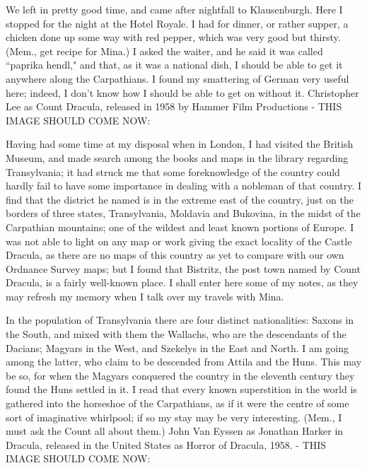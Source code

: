 We left in pretty good time, and came after nightfall to Klausenburgh. Here I stopped for the night at the Hotel Royale. I had for dinner, or rather supper, a chicken done up some way with red pepper, which was very good but thirsty. (Mem., get recipe for Mina.) I asked the waiter, and he said it was called ``paprika hendl," and that, as it was a national dish, I should be able to get it anywhere along the Carpathians. I found my smattering of German very useful here; indeed, I don't know how I should be able to get on without it. Christopher Lee as Count Dracula, released in 1958 by Hammer Film Productions - THIS IMAGE SHOULD COME NOW:

\renewcommand{\varCaption}{Christopher Lee as Count Dracula, released in 1958 by Hammer Film Productions.}
\renewcommand{\varImgPath}{_content/Christopher_Lee_as_Dracula-300x216.jpg}


Having had some time at my disposal when in London, I had visited the British Museum, and made search among the books and maps in the library regarding Transylvania; it had struck me that some foreknowledge of the country could hardly fail to have some importance in dealing with a nobleman of that country. I find that the district he named is in the extreme east of the country, just on the borders of three states, Transylvania, Moldavia and Bukovina, in the midst of the Carpathian mountains; one of the wildest and least known portions of Europe. I was not able to light on any map or work giving the exact locality of the Castle Dracula, as there are no maps of this country as yet to compare with our own Ordnance Survey maps; but I found that Bistritz, the post town named by Count Dracula, is a fairly well-known place. I shall enter here some of my notes, as they may refresh my memory when I talk over my travels with Mina.

In the population of Transylvania there are four distinct nationalities: Saxons in the South, and mixed with them the Wallachs, who are the descendants of the Dacians; Magyars in the West, and Szekelys in the East and North. I am going among the latter, who claim to be descended from Attila and the Huns. This may be so, for when the Magyars conquered the country in the eleventh century they found the Huns settled in it. I read that every known superstition in the world is gathered into the horseshoe of the Carpathians, as if it were the centre of some sort of imaginative whirlpool; if so my stay may be very interesting. (Mem., I must ask the Count all about them.) John Van Eyssen as Jonathan Harker in Dracula, released in the United States as Horror of Dracula, 1958. - THIS IMAGE SHOULD COME NOW:

